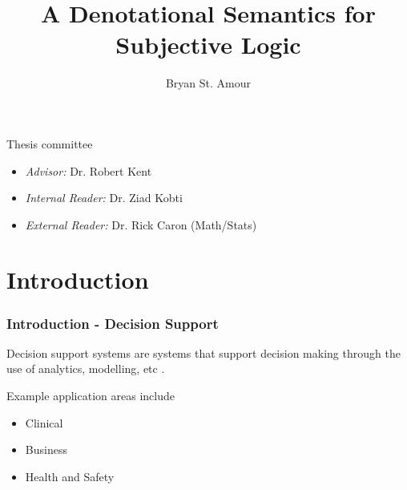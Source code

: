 \documentclass{beamer}
\title{A Denotational Semantics for Subjective Logic}
\author{Bryan St. Amour}
\begin{document}


\begin{frame}
\titlepage
\end{frame}

\begin{frame}

Thesis committee

\begin{itemize}
  \item \emph{Advisor:} Dr. Robert Kent
  \item \emph{Internal Reader:} Dr. Ziad Kobti
  \item \emph{External Reader:} Dr. Rick Caron (Math/Stats)
\end{itemize}

\end{frame}

\begin{frame}
\tableofcontents
\end{frame}



\section{Introduction}

\begin{frame}
\frametitle{Introduction - Decision Support}

Decision support systems are systems that support decision making
through the use of analytics, modelling, etc \cite{sprague_framework_1980}.

Example application areas include

\begin{itemize}
  \item Clinical \cite{berner2007clinical}
  \item Business \cite{klein_knowledge-based}
  \item Health and Safety \cite{kent2010application}
\end{itemize}

\end{frame}


\end{document}
